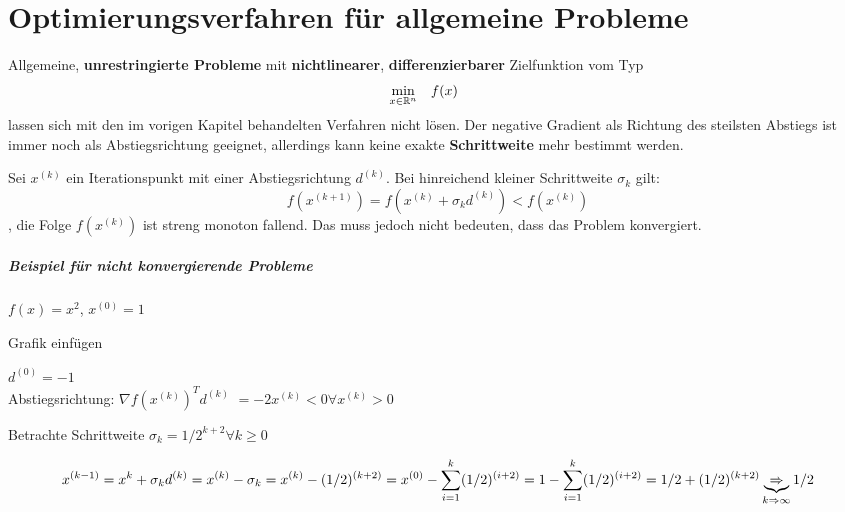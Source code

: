 \chapter{Optimierungsverfahren für allgemeine Probleme}

Allgemeine, \textbf {unrestringierte Probleme} mit \textbf {nichtlinearer}, \textbf {differenzierbarer} Zielfunktion vom Typ
\begin{equation}
			\begin{aligned}
				\min_{x\in\mathbb R^n}
				& & & f(x) & & &
			\end{aligned}
\end{equation}
lassen sich mit den im vorigen Kapitel behandelten Verfahren nicht lösen. Der negative Gradient als Richtung des steilsten Abstiegs ist immer noch als Abstiegsrichtung geeignet, allerdings kann keine exakte \textbf {Schrittweite} mehr bestimmt werden.

Sei $x^{(k)}$ ein Iterationspunkt mit einer Abstiegsrichtung $d^{(k)}$. Bei hinreichend kleiner Schrittweite $\sigma_k$ gilt:
\begin{equation}
	f(x^{(k+1)}) = f(x^{(k)} + \sigma_kd^{(k)}) < f(x^{(k)})
\end{equation}
, die Folge ${f(x^{(k)})}$ ist streng monoton fallend. Das muss jedoch nicht bedeuten, dass das Problem konvergiert.

\paragraph{Beispiel für nicht konvergierende Probleme}

$f(x)= x^2$, $x^{(0)} = 1$

Grafik einfügen

$d^{(0)} = -1$ \\
Abstiegsrichtung: $\nabla f(x^{(k)})^T d^{(k)}$
$=  -2x^{(k)} < 0 \forall x^{(k)} > 0$

Betrachte Schrittweite $\sigma_k = 1/2^{k+2} \forall k \geq 0$

\begin{equation}
x^{(k-1)} = x^k + \sigma_k d^{(k)} \\
= x^{(k)} - \sigma_k \\
= x^{(k)} - (1/2)^{(k+2)} \\
= x^{(0)} - \sum\limits_{i=1}^k (1/2)^{(i+2)} \\
= 1 - \sum\limits_{i=1}^k (1/2)^{(i+2)} \\
= 1/2 + (1/2)^{(k+2)}  \underbrace{\Rightarrow}_{k\Rightarrow \infty} 1/2
\end{equation}


